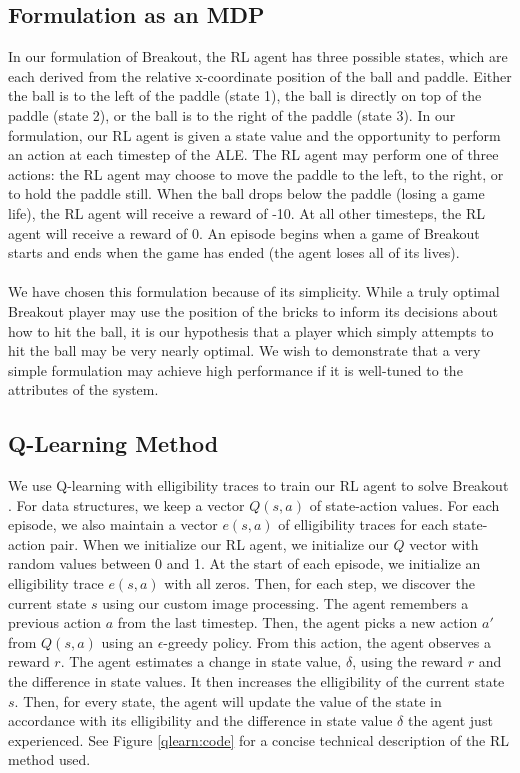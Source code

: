 \documentclass{article}
\begin{document}
\subsection{Formulation as an MDP}
In our formulation of Breakout, the RL agent has three possible states, which are each derived from the relative x-coordinate position of the ball and paddle.  Either the ball is to the left of the paddle (state 1), the ball is directly on top of the paddle (state 2), or the ball is to the right of the paddle (state 3).  In our formulation, our RL agent is given a state value and the opportunity to perform an action at each timestep of the ALE.  The RL agent may perform one of three actions: the RL agent may choose to move the paddle to the left, to the right, or to hold the paddle still.  When the ball drops below the paddle (losing a game life), the RL agent will receive a reward of -10.  At all other timesteps, the RL agent will receive a reward of 0.  An episode begins when a game of Breakout starts and ends when the game has ended (the agent loses all of its lives).
\\\\
We have chosen this formulation because of its simplicity.  While a truly optimal Breakout player may use the position of the bricks to inform its decisions about how to hit the ball, it is our hypothesis that a player which simply attempts to hit the ball may be very nearly optimal.  We wish to demonstrate that a very simple formulation may achieve high performance if it is well-tuned to the attributes of the system.
\subsection{Q-Learning Method}
We use Q-learning with elligibility traces to train our RL agent to solve Breakout \cite{sutton}.  For data structures, we keep a vector $Q(s, a)$ of state-action values.  For each episode, we also maintain a vector $e(s, a)$ of elligibility traces for each state-action pair.  When we initialize our RL agent, we initialize our $Q$ vector with random values between 0 and 1.  At the start of each episode, we initialize an elligibility trace $e(s, a)$ with all zeros.  Then, for each step, we discover the current state $s$ using our custom image processing.  The agent remembers a previous action $a$ from the last timestep.  Then, the agent picks a new action $a'$ from $Q(s, a)$ using an $\epsilon$-greedy policy.  From this action, the agent observes a reward $r$.  The agent estimates a change in state value, $\delta$, using the reward $r$ and the difference in state values.  It then increases the elligibility of the current state $s$.  Then, for every state, the agent will update the value of the state in accordance with its elligibility and the difference in state value $\delta$ the agent just experienced.  See Figure \ref{qlearn:code} for a concise technical description of the RL method used.
\end{document}
